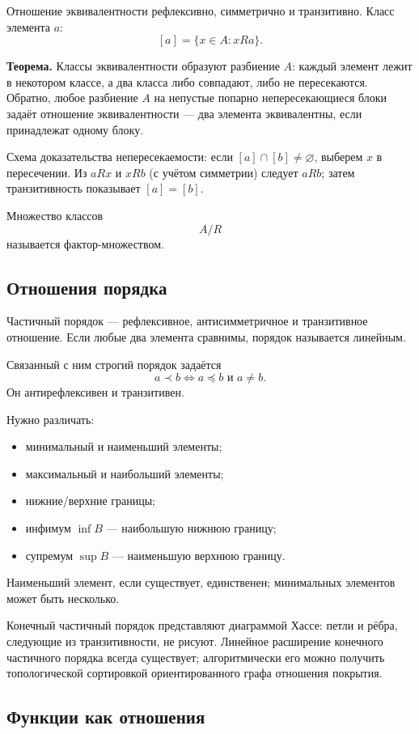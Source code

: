 Отношение эквивалентности рефлексивно, симметрично и транзитивно. Класс элемента
$a$:
\[
    [a]=\{x\in A:xRa\}.
\]

\textbf{Теорема.} Классы эквивалентности образуют разбиение $A$: каждый элемент
лежит в некотором классе, а два класса либо совпадают, либо не пересекаются.
Обратно, любое разбиение $A$ на непустые попарно непересекающиеся блоки задаёт
отношение эквивалентности --- два элемента эквивалентны, если принадлежат одному
блоку.

Схема доказательства непересекаемости: если $[a]\cap[b]\ne\varnothing$, выберем
$x$ в пересечении. Из $aRx$ и $xRb$ (с учётом симметрии) следует $aRb$; затем
транзитивность показывает $[a]=[b]$.

Множество классов
\[
    A/R
\]
называется фактор-множеством.

\subsection{Отношения порядка}

Частичный порядок --- рефлексивное, антисимметричное и транзитивное отношение.
Если любые два элемента сравнимы, порядок называется линейным.

Связанный с ним строгий порядок задаётся
\[
    a\prec b\iff a\preceq b\text{ и }a\ne b.
\]
Он антирефлексивен и транзитивен.

Нужно различать:
\begin{itemize}
 \item минимальный и наименьший элементы;
 \item максимальный и наибольший элементы;
 \item нижние/верхние границы;
 \item инфимум $\inf B$ --- наибольшую нижнюю границу;
 \item супремум $\sup B$ --- наименьшую верхнюю границу.
\end{itemize}
Наименьший элемент, если существует, единственен; минимальных элементов может
быть несколько.

Конечный частичный порядок представляют диаграммой Хассе: петли и рёбра,
следующие из транзитивности, не рисуют. Линейное расширение конечного частичного
порядка всегда существует; алгоритмически его можно получить топологической
сортировкой ориентированного графа отношения покрытия.

\subsection{Функции как отношения}

